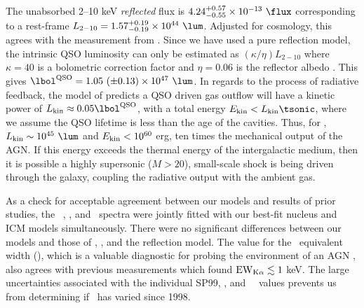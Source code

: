 \documentclass[useAMS,usenatbib]{mn2e}
\begin{document}
The unabsorbed 2--10 keV {\it{reflected}} flux is
$4.24^{+0.57}_{-0.55} \times 10^{-13} ~\flux$ corresponding to a
rest-frame $L_{2-10} = 1.57^{+0.19}_{-0.19} \times 10^{44}
~\lum$. Adjusted for cosmology, this agrees with the measurement from
\citet{2001MNRAS.321L..15I}. Since we have used a pure reflection
model, the intrinsic QSO luminosity can only be estimated as
$(\kappa/\eta) L_{2-10}$ where $\kappa = 40$ is a bolometric
correction factor \citep{2007MNRAS.381.1235V} and $\eta = 0.06$ is the
reflector albedo \citep{2009MNRAS.397.1549M}. This gives $\lqso = 1.05
~(\pm 0.13) \times 10^{47} ~\lum$. In regards to the process of
radiative feedback, the model of \citet{2005ApJ...619...60L} predicts
a QSO driven gas outflow will have a kinetic power of $L_{\rm{kin}}
\approx 0.05 \lqso$, with a total energy $E_{\rm{kin}} < L_{\rm{kin}}
\tsonic$, where we assume the QSO lifetime is less than the age of the
cavities. Thus, for \irs, $L_{\rm{kin}} \sim 10^{45} ~\lum$ and
$E_{\rm{kin}} < 10^{60}$ erg, ten times the mechanical output of the
AGN. If this energy exceeds the thermal energy of the intergalactic
medium, then it is possible a highly supersonic ($M > 20$),
small-scale shock is being driven through the galaxy, coupling the
radiative output with the ambient gas.

As a check for acceptable agreement between our models and results of
prior studies, the \rf\ \chandra, \xmm, and \bepposax\ spectra were
jointly fitted with our best-fit nucleus and ICM models
simultaneously. There were no significant differences between our
models and those of \citet{2000A&A...353..910F},
\citet{2001MNRAS.321L..15I}, and the \citet{2007A&A...473...85P}
reflection model. The value for the \feka\ equivalent width (\fekaew),
which is a valuable diagnostic for probing the environment of an AGN
\citep[see][for a review]{2000PASP..112.1145F}, also agrees with
previous measurements which found $\mathrm{EW}_{\mathrm{K}\alpha} \lesssim 1$ keV. The large
uncertainties associated with the individual SP99, \xmm, and
\bepposax\ \fekaew\ values prevents us from determining if
\fekaew\ has varied since 1998.
\end{document}
